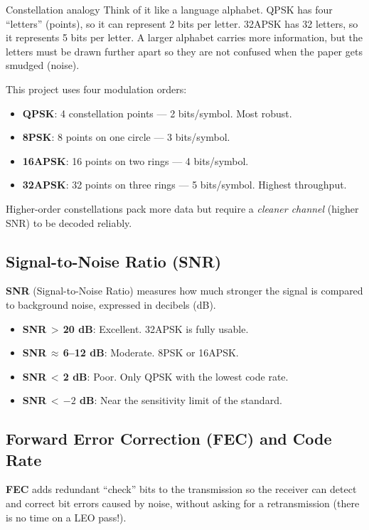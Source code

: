 \documentclass[12pt,a4paper]{report}
\begin{document}
\begin{conceptbox}{Constellation analogy}
Think of it like a language alphabet.  QPSK has four ``letters'' (points), so it
can represent 2 bits per letter.  32APSK has 32 letters, so it represents 5 bits
per letter.  A larger alphabet carries more information, but the letters must be
drawn further apart so they are not confused when the paper gets smudged (noise).
\end{conceptbox}

This project uses four modulation orders:
\begin{itemize}
    \item \textbf{QPSK}: 4 constellation points --- 2 bits/symbol.  Most robust.
    \item \textbf{8PSK}: 8 points on one circle --- 3 bits/symbol.
    \item \textbf{16APSK}: 16 points on two rings --- 4 bits/symbol.
    \item \textbf{32APSK}: 32 points on three rings --- 5 bits/symbol.  Highest throughput.
\end{itemize}
Higher-order constellations pack more data but require a \emph{cleaner channel}
(higher SNR) to be decoded reliably.

\subsection*{Signal-to-Noise Ratio (SNR)}

\textbf{SNR} (Signal-to-Noise Ratio) measures how much stronger the signal is
compared to background noise, expressed in decibels (dB).
\begin{itemize}
    \item \textbf{SNR\,$>$\,20 dB}: Excellent.  32APSK is fully usable.
    \item \textbf{SNR\,$\approx$\,6--12 dB}: Moderate.  8PSK or 16APSK.
    \item \textbf{SNR\,$<$\,2 dB}: Poor.  Only QPSK with the lowest code rate.
    \item \textbf{SNR\,$<$\,$-2$ dB}: Near the sensitivity limit of the standard.
\end{itemize}

\subsection*{Forward Error Correction (FEC) and Code Rate}

\textbf{FEC} adds redundant ``check'' bits to the transmission so the receiver
can detect and correct bit errors caused by noise, without asking for a
retransmission (there is no time on a LEO pass!).
\end{document}
